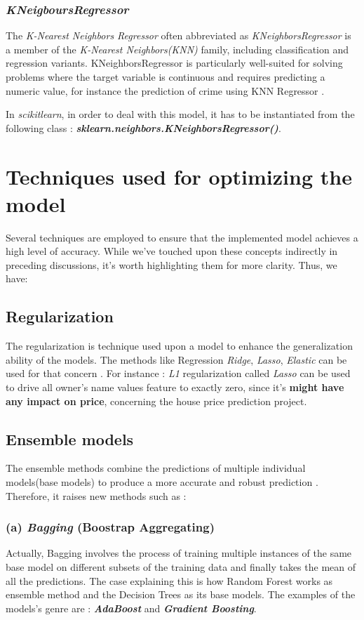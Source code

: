 \documentclass[12pt,a4paper, oneside]{book}
\begin{document}
 \subsubsection{\textit{KNeigboursRegressor}}
 The \textit{K-Nearest Neighbors Regressor} often abbreviated as \textit{KNeighborsRegressor} is a member of the \textit{K-Nearest Neighbors(KNN)} family, including classification and regression variants. KNeighborsRegressor is particularly well-suited for solving problems where the target variable is continuous and requires predicting a numeric value, for instance the prediction of crime using KNN Regressor \citep{alsayadi2022improving}.
 
 In \textit{scikitlearn}, in order to deal with this model, it has to be instantiated from the following class : \newline \textit{\textbf{sklearn.neighbors.KNeighborsRegressor()}}. 
 
\section{Techniques used for optimizing the model}  
Several techniques are employed to ensure that the implemented model achieves a high level of accuracy. While we've touched upon these concepts indirectly in preceding discussions, it's worth highlighting them for more clarity. Thus, we have:
\subsection*{Regularization} 
The regularization is technique used upon a model to enhance the generalization ability of the models. The methods like Regression \textit{Ridge}, \textit{Lasso},  \textit{Elastic} can be used for that concern \citep{mlwithpython}.  For instance : \textit{L1} regularization called \textit{Lasso} can be used to drive all  owner's name values feature to exactly zero, since it's \textbf{might have any impact on price}, concerning the house price prediction project.
\subsection*{Ensemble models}
The ensemble methods combine the predictions of multiple individual models(base models) to produce a more accurate and robust prediction \citep{kabari2019comparison}. Therefore, it raises new methods such as :
\subsubsection{(a) \textit{Bagging} (Boostrap Aggregating)} 
Actually, Bagging involves the process of training multiple instances of the same base model on different subsets of the training data and finally takes the mean of all the predictions. The case explaining this is how Random Forest works as ensemble method and the Decision Trees as its base models. The examples of the models's genre are : \textbf{\textit{AdaBoost}} and \textbf{\textit{Gradient Boosting}}.
\end{document}
